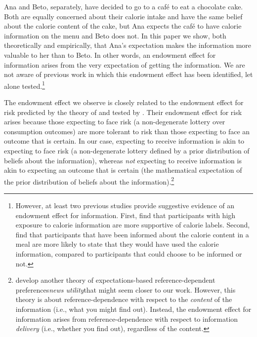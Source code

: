 
Ana and Beto, separately, have decided to go to a café to eat a chocolate cake. Both are equally concerned about their calorie intake and have the same belief about the calorie content of the cake, but Ana expects the café to have calorie information on the menu and Beto does not. In this paper we show, both theoretically and empirically, that Ana’s expectation makes the information more valuable to her than to Beto.  In other words, an endowment effect for information arises from the very expectation of getting the information. We are not aware of previous work in which this endowment effect has been identified, let alone tested.\footnote{However, at least two previous studies provide suggestive evidence of an endowment effect for information. First,  \citet{cawleyImpactInformationDisclosure2020} find that participants with high exposure to calorie information are more supportive of calorie labels. Second, \cite{nordstromStrategicIgnoranceHealth2020} find that participants that have been informed about the calorie content in a meal are more likely to state that they would have used the calorie information, compared to participants that could choose to be informed or not.}





The endowment effect we observe is closely related to the endowment effect for risk predicted by the theory of \citet{koszegiReferenceDependentRiskAttitudes2007} and tested by \citet{sprengerEndowmentEffectRisk2015}. Their endowment effect for risk arises because those expecting to face risk (a non-degenerate lottery over consumption outcomes) are more tolerant to risk than those expecting to face an outcome that is certain. In our case, expecting to receive information is akin to expecting to face risk (a non-degenerate lottery defined by a prior distribution of beliefs about the information), whereas \emph{not} expecting to receive information is akin to expecting an outcome that is certain (the mathematical expectation of the prior distribution of beliefs about the information).\footnote{\citet{koszegiReferenceDependentConsumptionPlans2009} develop another theory of expectations-based reference-dependent preferences\textemdash\emph{news utility}\textemdash that might seem closer to our work. However, this theory is about reference-dependence with respect to the \emph{content} of the information (i.e., what you might find out). Instead, the endowment effect for information arises from reference-dependence with respect to information \emph{delivery} (i.e., whether you find out), regardless of the content.}

